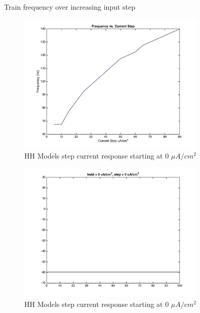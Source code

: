 \documentclass{beamer}
\begin{document}
\begin{frame}{Train frequency over increasing input step}

\begin{figure}
    \centering
    \includegraphics[width = 0.8\textwidth]{./images/freqvscurrent.jpg}
    \caption{HH Models step current response starting at 0 $\mu A/cm^2$}
  \end{figure}

\end{frame}

\begin{frame}
  \begin{figure}
    \centering
    \includegraphics[width = 0.8\textwidth]{./images/current_0_0.jpg}
    \caption{HH Models step current response starting at 0 $\mu A/cm^2$}
  \end{figure}
\end{frame}
\end{document}
